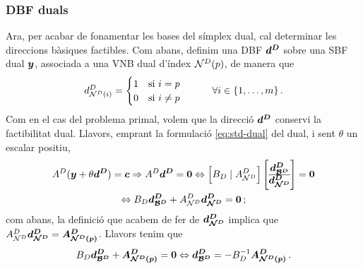 \subsubsection{DBF duals}
Ara, per acabar de fonamentar les bases del símplex dual, cal determinar les 
direccions bàsiques factibles. Com abans, definim una DBF $\boldsymbol{d^D}$ sobre una 
SBF dual $\boldsymbol{y}$, associada a una VNB dual d'índex $\mathcal{N}^D(p)$, de manera que
\[
{d^D_{\mathcal{N}^D(i)}} =
\begin{cases}
1 \quad \text{si } i = p\\
0 \quad \text{si } i \ne p
\end{cases}
\qquad \forall i \in \{1,\ldots,m\}\,.
\]
Com en el cas del problema primal, volem que la direcció $\boldsymbol{d^D}$ conservi la 
factibilitat dual. Llavors, emprant la formulació \eqref{eq:std-dual} del dual, 
i sent $\theta$ un escalar positiu,
\begin{multline*}
A^D(\vb{y}+\theta\vb{d^D}) = \vb{c} \Rightarrow A^D\vb{d^D} = \vb{0} 
\Leftrightarrow \left[B_D \;\vert\; A^D_{\N^D} \right]
\left[
\begin{array}{@{}c@{}}
\vb{d^D_{\B^D}}\\
\hline
\vb{d^D_{\N^D}}
\end{array}
\right]
= \vb{0}\\
%
\Leftrightarrow
B_D\vb{d^D_{\B^D}} + A^D_{\N^D}\vb{d^D_{\N^D}} = \vb{0}\,;
\end{multline*}
com abans, la definició que acabem de fer de $\boldsymbol{d^D_{\mathcal{N}^D}}$ implica que 
$A^D_{\mathcal{N}^D}\boldsymbol{d^D_{\mathcal{N}^D}} = \boldsymbol{A^D_{\mathcal{N}^D(p)}}$. Llavors tenim que
\begin{equation}\label{eq:DBF-dual}
B_D\boldsymbol{d^D_{\mathcal{B}^D}} + \boldsymbol{A^D_{\mathcal{N}^D(p)}} = \boldsymbol{0} \Leftrightarrow 
\boldsymbol{d^D_{\mathcal{B}^D}} = -B^{-1}_D \boldsymbol{A^D_{\mathcal{N}^D(p)}}\,. 
\end{equation}

